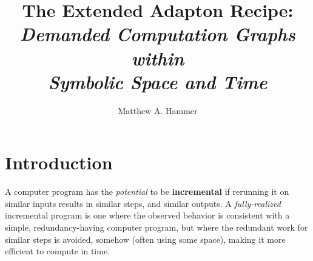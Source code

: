 \documentclass[11pt]{article}
\begin{document}
\author{Matthew A. Hammer}
\title{The Extended Adapton Recipe:
  \\
  \emph{Demanded Computation Graphs\\
  within\\
  Symbolic Space and Time}
}

\maketitle

\linenumbers

\newcommand{\SeqTreeBinaryNode}[2]{\begin{tabular}{|c|}\hline{\ttfamily\itshape \color{gray}{#1}}\\\hline {\tiny #2}\\\hline\end{tabular}}
\newcommand{\SeqTreeElement}[2]{\begin{tabular}{|c|}\hline{\ttfamily\itshape\color{gray}{#1}}\\\hline\bfseries #2\\\hline\end{tabular}}

\section{Introduction}

A computer program has the \emph{potential} to be \textbf{incremental} if
rerunning it on similar inputs results in similar steps, and similar
outputs.
%
A \emph{fully-realized} incremental program is one where the observed
behavior is consistent with a simple, redundancy-having computer program,
but where the redundant work for similar steps is
avoided, somehow (often using some space), making it more efficient to compute in time.
\end{document}
